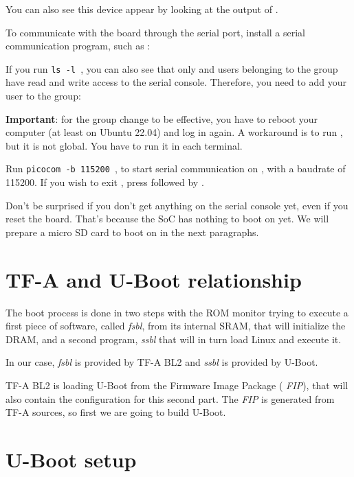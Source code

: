 You can also see this device appear by looking at the output of
.

To communicate with the board through the serial port, install a
serial communication program, such as :


If you run {\tt ls -l \hosttty}, you can also see that only
 and users belonging to the  group have
read and write access to the serial console. Therefore, you need
to add your user to the  group:


{\bf Important}: for the group change to be effective, you have to
reboot your computer (at least on Ubuntu 22.04) and log in again.
A workaround is to run , but it is not global.
You have to run it in each terminal.

Run {\tt picocom -b 115200 \hosttty}, to start serial
communication on {\tt \hosttty}, with a baudrate of 115200.
If you wish to exit , press \code{[Ctrl][a]} followed by
\code{[Ctrl][x]}.

Don't be surprised if you don't get anything on the serial console yet,
even if you reset the board. That's because the SoC has nothing to boot
on yet. We will prepare a micro SD card to boot on in the next paragraphs.

\section{TF-A and U-Boot relationship}

The boot process is done in two steps with the ROM monitor trying to
execute a first piece of software, called {\em fsbl}, from its
internal SRAM, that will initialize the DRAM, and a second program,
{\em ssbl} that will in turn load Linux and execute it.

In our case, {\em fsbl} is provided by TF-A BL2 and {\em
  ssbl} is provided by U-Boot.

TF-A BL2 is loading U-Boot from the Firmware Image Package ({\em
  FIP}), that will also contain the configuration for this second
part. The {\em FIP} is generated from TF-A sources, so first we are
going to build U-Boot.

\section{U-Boot setup}

